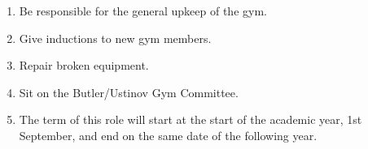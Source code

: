 \begin{enumerate}
    \item Be responsible for the general upkeep of the gym.
    \item Give inductions to new gym members. 
    \item Repair broken equipment.
    \item Sit on the Butler/Ustinov Gym Committee.
    \item The term of this role will start at the start of the academic year, 1st September, and end on the same date of the following year.
    
\end{enumerate}

